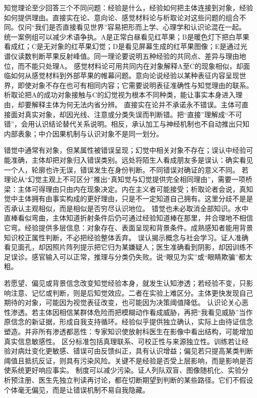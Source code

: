  知觉理论至少回答三个不同问题：经验是什么，经验如何把主体连接到对象，经验如何提供理由。直接实在论、意向论、感觉材料论与析取论对这些问题的组合不同。仅问“我们是否直接看见世界”容易把形而上学、心理学和认识论混在一起。 统一案例组可以减少术语争执。A是正常白昼看见红苹果；B是暖色灯下把白苹果看成红；C是无对象的红苹果幻觉；D是看见屏幕生成的红苹果图像；E是通过光谱仪读数判断苹果反射峰值。同一理论要说明五种经验的共同点、差异与理由地位，而不能只处理A。 感觉材料论可用共同内在对象解释A至C的现象相似，却面临如何从感觉材料到外部苹果的帷幕问题。意向论说经验以某种表征内容呈现世界，即使对象不存在也可有相同内容；它需要说明表征准确性与知觉理由的联系。析取论把A的成功对象接触与C的幻觉视为根本不同种类，能让事实本身进入理由，却要解释主体为何无法内省分辨。 直接实在论并不承诺永不错误。主体可直接面对真实对象，却因光线、注意或分类失误而判断错。把“直接”理解成“不可错”，会用认识结论替代关系说明。相反，承认加工与神经机制也不自动推出只知内部表象；中介因果机制与认识对象不是同一划分。

错觉中通常有对象，但某属性被错误呈现；幻觉中相关对象不存在；误认中经验可能准确，主体却把对象归入错误类别。远处将陌生人看成朋友多是误认：确实看见一个人，轮廓也许无误，错误发生在身份判断。不同错误对确证的意义不同。 若理论从“幻觉主观上不可区分”推出“真知觉与幻觉提供完全相同理由”，需要一项桥梁：主体可得理由只由内在现象决定。内在主义者可能接受；析取论者会说，真知觉中主体拥有由事实构成的更好理由，只是不一定知道自己拥有。这里分歧不是是否承认主观相似，而是相似是否穷尽认识地位。 错觉也未必取消全部知识。水中直棒看似弯曲，主体知道折射条件后仍可通过经验知道棒在那里，并合理地不相信它弯。经验提供多层信息：对象存在、表面呈现和背景条件。成熟感知者能用背景知识校正属性判断，不必把经验整体丢弃。 误认揭示概念与社会学习。证人准确看见面孔，却因照片阵列提示把它归为某嫌疑人；医生准确看到阴影，却因训练不足误诊。感官输入可以正常，推理与分类仍失败。说“眼见为实”或“眼睛欺骗”都太粗。

若愿望、偏见或背景信念改变知觉经验本身，就发生认知渗透；若经验不变，只影响注意、记忆或判断，则是后知觉效应。二者在实验上难区分。主体更快发现自己期待的对象，可能因为视觉表征改变，也可能因为决策阈值降低。 认识论关心恶性渗透。若主体因相信某群体危险而把模糊动作看成威胁，再把“我看见威胁”当作原信念的新证据，形成自我支持循环。经验似乎提供独立确认，实际上由待证信念塑造。并非所有渗透都恶性：专家知识使放射科医生在影像中看出结构，可能增加真实信息敏感性。 区分标准包括真理联系、可校正性与来源独立性。训练若让经验对病灶变化更敏感、错误可由反馈纠正，具有认识增益；偏见若只提高某类判断阈值且抵抗反证，则具有污染风险。关键不是经验是否受上层影响，而是影响是否使系统更好响应事实。 制度可以减少污染。证人列队双盲、图像随机化、实验分析预注册、医生先独立判读再讨论，都在切断期望到判断的某些路径。它们不假设个体毫无偏见，而是让错误机制不易自我隐藏。


